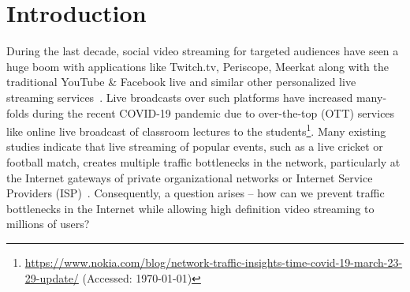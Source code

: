 \section{Introduction}
During the last decade, social video streaming for targeted audiences have seen a huge boom with applications like Twitch.tv, Periscope, Meerkat along with the traditional YouTube \& Facebook live and similar other personalized live streaming services~\cite{wang2016anatomy}. Live broadcasts over such platforms have increased many-folds during the recent COVID-19 pandemic due to over-the-top (OTT) services like online live broadcast of classroom lectures to the students\footnote{\url{https://www.nokia.com/blog/network-traffic-insights-time-covid-19-march-23-29-update/} (Accessed: \today)}. Many existing studies indicate that live streaming of popular events, such as a live cricket or football match, creates multiple traffic bottlenecks in the network, particularly at the Internet gateways of private organizational networks or Internet Service Providers (ISP)~\cite{yan2018understanding}. Consequently, a question arises -- how can we prevent traffic bottlenecks in the Internet while allowing high definition video streaming to millions of users? 

